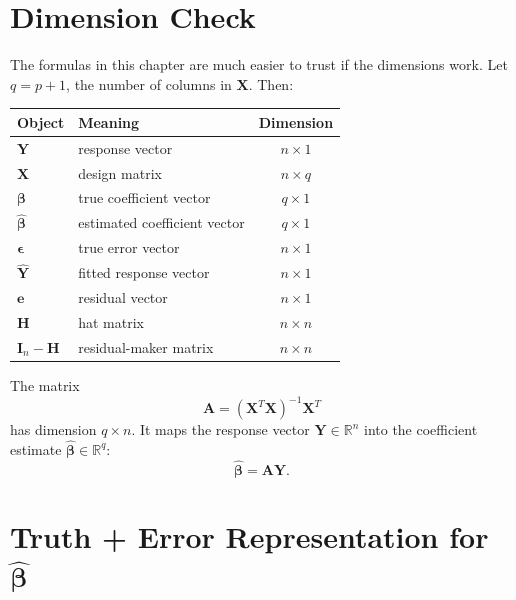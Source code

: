 \section{Dimension Check}

The formulas in this chapter are much easier to trust if the dimensions work.  Let \(q=p+1\), the number of columns in \(\mathbf{X}\).  Then:
\begin{center}
\begin{tabular}{llc}
\toprule
Object & Meaning & Dimension \\
\midrule
\(\mathbf{Y}\) & response vector & \(n\times 1\) \\
\(\mathbf{X}\) & design matrix & \(n\times q\) \\
\(\boldsymbol{\beta}\) & true coefficient vector & \(q\times 1\) \\
\(\widehat{\boldsymbol{\beta}}\) & estimated coefficient vector & \(q\times 1\) \\
\(\boldsymbol{\epsilon}\) & true error vector & \(n\times 1\) \\
\(\widehat{\mathbf{Y}}\) & fitted response vector & \(n\times 1\) \\
\(\mathbf{e}\) & residual vector & \(n\times 1\) \\
\(\mathbf{H}\) & hat matrix & \(n\times n\) \\
\(\mathbf{I}_n-\mathbf{H}\) & residual-maker matrix & \(n\times n\) \\
\bottomrule
\end{tabular}
\end{center}

The matrix
\begin{equation}
  \mathbf{A}=(\mathbf{X}^T\mathbf{X})^{-1}\mathbf{X}^T
\end{equation}
has dimension \(q\times n\).  It maps the response vector \(\mathbf{Y}\in\mathbb{R}^n\) into the coefficient estimate \(\widehat{\boldsymbol{\beta}}\in\mathbb{R}^q\):
\begin{equation}
  \widehat{\boldsymbol{\beta}}=\mathbf{A}\mathbf{Y}.
\end{equation}

\section{Truth + Error Representation for \texorpdfstring{\(\widehat{\boldsymbol{\beta}}\)}{beta-hat}}

